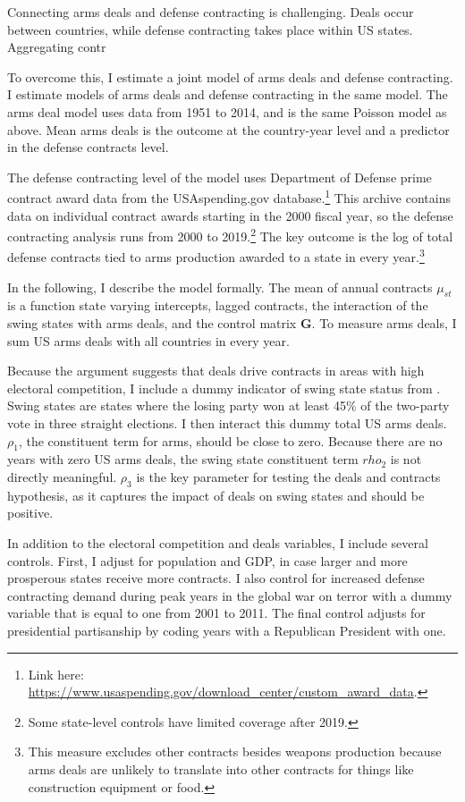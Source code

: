 \documentclass[12pt]{article}
\begin{document}
Connecting arms deals and defense contracting is challenging. 
Deals occur between countries, while defense contracting takes place within US states. 
Aggregating contr


To overcome this, I estimate a joint model of arms deals and defense contracting. 
I estimate models of arms deals and defense contracting in the same model.
The arms deal model uses data from 1951 to 2014, and is the same Poisson model as above. 
Mean arms deals is the outcome at the country-year level and a predictor in the defense contracts level. 


The defense contracting level of the model uses Department of Defense prime contract award data from the USAspending.gov database.\footnote{Link here: \url{https://www.usaspending.gov/download_center/custom_award_data}.} 
This archive contains data on individual contract awards starting in the 2000 fiscal year, so the defense contracting analysis runs from 2000 to 2019.\footnote{Some state-level controls have limited coverage after 2019.}
The key outcome is the log of total defense contracts tied to arms production awarded to a state in every year.\footnote{This measure excludes other contracts besides weapons production because arms deals are unlikely to translate into other contracts for things like construction equipment or food.}


In the following, I describe the model formally.
The mean of annual contracts $\mu_{st}$ is a function state varying intercepts, lagged contracts, the interaction of the swing states with arms deals, and the control matrix \textbf{G}. 
To measure arms deals, I sum US arms deals with all countries in every year. 


Because the argument suggests that deals drive contracts in areas with high electoral competition, I include a dummy indicator of swing state status from \citep{KrinerReeves2015}.
Swing states are states where the losing party won at least 45\% of the two-party vote in three straight elections. 
I then interact this dummy total US arms deals. 
$\rho_1$, the constituent term for arms, should be close to zero.
Because there are no years with zero US arms deals, the swing state constituent term $rho_2$ is not directly meaningful.  
$\rho_3$ is the key parameter for testing the deals and contracts hypothesis, as it captures the impact of deals on swing states and should be positive. 


In addition to the electoral competition and deals variables, I include several controls. 
First, I adjust for population and GDP, in case larger and more prosperous states receive more contracts. 
I also control for increased defense contracting demand during peak years in the global war on terror with a dummy variable that is equal to one from 2001 to 2011. 
The final control adjusts for presidential partisanship by coding years with a Republican President with one. 
\end{document}
